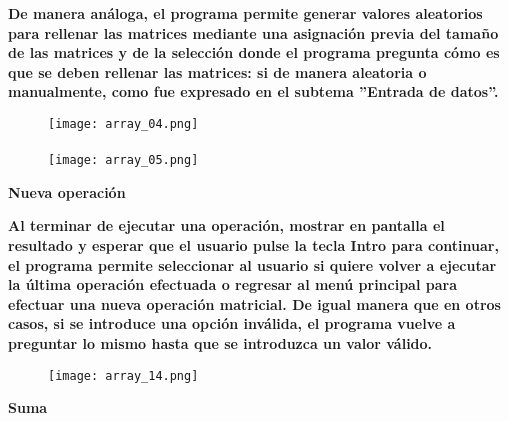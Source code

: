 \documentclass[letterpaper]{article}
\begin{document}
\begin{flushleft}
\textbf{\Large De manera an\'aloga, el programa permite generar valores aleatorios para rellenar las matrices mediante una asignaci\'on previa del tama\~no de las matrices y de la selecci\'on donde el programa pregunta c\'omo es que se deben rellenar las matrices: si de manera aleatoria o manualmente, como fue expresado en el subtema ''Entrada de datos''.\\}
\vspace{0.5cm}
\end{flushleft}
\begin{center}
\begin{figure}[H] %
\texttt{[image: array\_04.png]}
\\
\\
\texttt{[image: array\_05.png]}
\end{figure}
\end{center}

\begin{center}
\textbf{\LARGE Nueva operaci\'on\\}
\vspace{0.5cm}
\end{center}

\begin{flushleft}
\textbf{\Large Al terminar de ejecutar una operaci\'on, mostrar en pantalla el resultado y esperar que el usuario pulse la tecla Intro para continuar, el programa permite seleccionar al usuario si quiere volver a ejecutar la \'ultima operaci\'on efectuada o regresar al men\'u principal para efectuar una nueva operaci\'on matricial. De igual manera que en otros casos, si se introduce una opci\'on inv\'alida, el programa vuelve a preguntar lo mismo hasta que se introduzca un valor v\'alido.\\}
\vspace{0.5cm}
\end{flushleft}
\begin{center}
\begin{figure}[H] %
\texttt{[image: array\_14.png]}
\end{figure}
\end{center}

\clearpage

\begin{center}
\textbf{\LARGE Suma\\}
\vspace{0.5cm}
\end{center}
\end{document}
